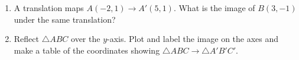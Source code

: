 \documentclass[12pt, twoside]{article}
\begin{document}
\begin{enumerate}
\item A translation maps $A(-2, 1) \rightarrow A'(5,1)$. What is the image of $B(3,-1)$ under the same translation? \vspace{1cm}

\item Reflect $\triangle ABC$ over the $y$-axis. Plot and label the image on the axes and make a table of the coordinates showing $\triangle ABC \rightarrow \triangle A'B'C'$.
  \begin{flushright}
  \end{flushright}

\end{enumerate}
\end{document}
